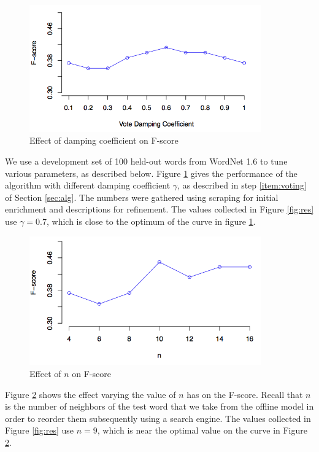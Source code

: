 \documentclass{article}
\begin{document}
\begin{figure}[hbtp]
\begin{center}
\includegraphics[width=100mm]{graphs/damping.png}
\end{center}
\caption{Effect of damping coefficient on F-score}
\label{fig:damping}
\end{figure}
We use a development set of 100 held-out words from WordNet 1.6 to tune various parameters, as described below.
Figure \ref{fig:damping} gives the performance of the algorithm with different damping coefficient $\gamma$, as described in step \ref{item:voting} of Section \ref{sec:alg}.
The numbers were gathered using scraping for initial enrichment and descriptions for refinement.
The values collected in Figure \ref{fig:res} use $\gamma=0.7$, which is close to the optimum of the curve in figure \ref{fig:damping}.

\begin{figure}[hbtp]
\begin{center}
\includegraphics[width=100mm]{graphs/n.png}
\end{center}
\caption{Effect of $n$ on F-score}
\label{fig:n}
\end{figure}
Figure \ref{fig:n} shows the effect varying the value of $n$ has on the F-score.
Recall that $n$ is the number of neighbors of the test word that we take from the offline model in order to reorder them subsequently using a search engine.
The values collected in Figure \ref{fig:res} use $n=9$, which is near the optimal value on the curve in Figure \ref{fig:n}.
\end{document}
